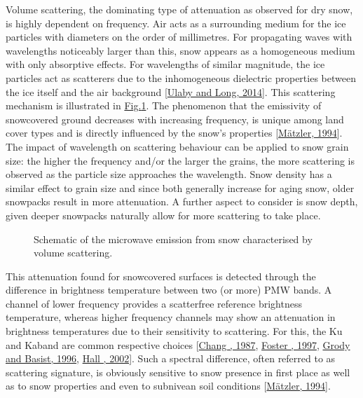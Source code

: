 \documentclass[letterpaper,10pt,english]{jupyterBook}
\let\sphinxpxdimen\pdfpxdimen\else\newdimen\sphinxpxdimen
\begin{document}
\sphinxAtStartPar
Volume scattering, the dominating type of attenuation as observed for dry snow, is highly dependent on frequency.
Air acts as a surrounding medium for the ice particles with diameters on the order of millimetres.
For propagating waves with wavelengths noticeably larger than this, snow appears as a homogeneous medium with only absorptive effects.
For wavelengths of similar magnitude, the ice particles act as scatterers due to the inhomogeneous dielectric properties between the ice itself and the air background {[}\hyperlink{cite.book/references:id15}{Ulaby and Long, 2014}{]}.
This scattering mechanism is illustrated in \hyperref[\detokenize{book/introduction_purpose_scope:emission-scattering}]{Fig.\@ \ref{\detokenize{book/introduction_purpose_scope:emission-scattering}}}.
The phenomenon that the emissivity of snow\sphinxhyphen{}covered ground decreases with increasing frequency, is unique among land cover types and is directly influenced by the snow’s properties {[}\hyperlink{cite.book/references:id13}{Mätzler, 1994}{]}.
The impact of wavelength on scattering behaviour can be applied to snow grain size: the higher the frequency and/or the larger the grains, the more scattering is observed as the particle size approaches the wavelength.
Snow density has a similar effect to grain size and since both generally increase for aging snow, older snowpacks result in more attenuation.
A further aspect to consider is snow depth, given deeper snowpacks naturally allow for more scattering to take place.

\begin{figure}[htbp]
\centering
\capstart

\noindent\sphinxincludegraphics[width=350\sphinxpxdimen]{{emission-scattering}.png}
\caption{Schematic of the microwave emission from snow characterised by volume scattering.}\label{\detokenize{book/introduction_purpose_scope:emission-scattering}}\end{figure}

\sphinxAtStartPar
This attenuation found for snow\sphinxhyphen{}covered surfaces is detected through the difference in brightness temperature between two (or more) PMW bands.
A channel of lower frequency provides a scatter\sphinxhyphen{}free reference brightness temperature, whereas higher frequency channels may show an attenuation in brightness temperatures due to their sensitivity to scattering.
For this, the Ku and Ka\sphinxhyphen{}band are common respective choices {[}\hyperlink{cite.book/references:id7}{Chang , 1987}, \hyperlink{cite.book/references:id8}{Foster , 1997}, \hyperlink{cite.book/references:id9}{Grody and Basist, 1996}, \hyperlink{cite.book/references:id2}{Hall , 2002}{]}.
Such a spectral difference, often referred to as scattering signature, is obviously sensitive to snow presence in first place as well as to snow properties and even to subnivean soil conditions {[}\hyperlink{cite.book/references:id13}{Mätzler, 1994}{]}.
\end{document}
